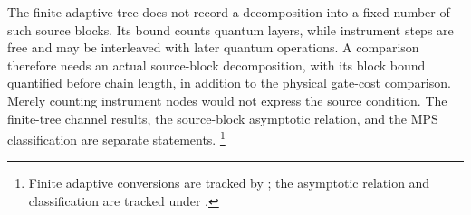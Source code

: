 \documentclass{article}
\begin{document}
The finite adaptive tree does not record a decomposition into a fixed
number of such source blocks. Its bound counts quantum layers, while
instrument steps are free and may be interleaved with later quantum
operations. A comparison therefore needs an actual source-block
decomposition, with its block bound quantified before chain length,
in addition to the physical gate-cost comparison. Merely counting
instrument nodes would not express the source condition.
The finite-tree channel results, the source-block asymptotic relation,
and the MPS classification are separate statements.
\footnote{Finite adaptive conversions are tracked by ; the
asymptotic relation and classification are tracked under .}



\end{document}
